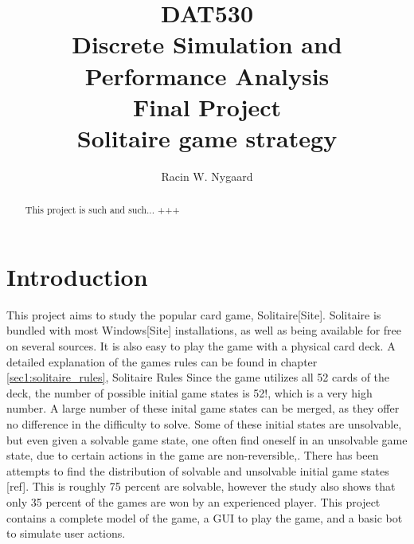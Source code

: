 \documentclass[runningheads,a4paper]{llncs}
\begin{document}
\mainmatter  %
\title{DAT530\\Discrete Simulation and Performance Analysis\\Final Project\\Solitaire game strategy}
\author{Racin W. Nygaard}

\tocauthor{ }
\maketitle
	


\begin{abstract}
This project is such and such... +++

\end{abstract}

\setcounter{tocdepth}{3}
\setcounter{secnumdepth}{3}

\tableofcontents
\listoffigures
\listoftables
\printacronyms[name=Abbreviations,include-classes=abbrev]
\printacronyms[name=Nomenclature,include-classes=nomencl]
\section{Introduction}
This project aims to study the popular card game, Solitaire[Site]. Solitaire is bundled with most Windows[Site] installations, as well as being available for free on several sources. It is also easy to play the game with a physical card deck. A detailed explanation of the games rules can be found in chapter \ref{sec1:solitaire_rules}, Solitaire Rules
\newline
Since the game utilizes all 52 cards of the deck, the number of possible initial game states is 52!, which is a very high number. A large number of these inital game states can be merged, as they offer no difference in the difficulty to solve. Some of these initial states are unsolvable, but even given a solvable game state, one often find oneself in an unsolvable game state, due to certain actions in the game are non-reversible,. There has been attempts to find the distribution of solvable and unsolvable initial game states [ref]. This is roughly 75 percent are solvable, however the study also shows that only 35 percent of the games are won by an experienced player.
\newline
This project contains a complete model of the game, a GUI to play the game, and a basic bot to simulate user actions. 
\end{document}
